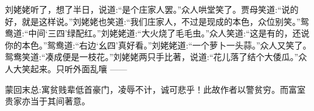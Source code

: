 \begin{parag}
刘姥姥听了，想了半日，说道:“是个庄家人罢。”众人哄堂笑了。贾母笑道:“说的好，就是这样说。”刘姥姥也笑道:“我们庄家人，不过是现成的本色，众位别笑。”鸳鸯道:“中间‘三四’绿配红。”刘姥姥道:“大火烧了毛毛虫。”众人笑道:“这是有的，还说你的本色。”鸳鸯道:“右边‘幺四’真好看。”刘姥姥道:“一个萝卜一头蒜。”众人又笑了。鸳鸯笑道:“凑成便是一枝花。”刘姥姥两只手比著，说道:“花儿落了结个大倭瓜。”众人大笑起来。只听外面乱嚷 ——
\end{parag}


\begin{parag}
    \begin{note}蒙回末总:寓贫贱辈低首豪门，凌辱不计，诚可悲乎！此故作者以警贫穷。而富室贵家亦当于其间著意。\end{note}
\end{parag}

